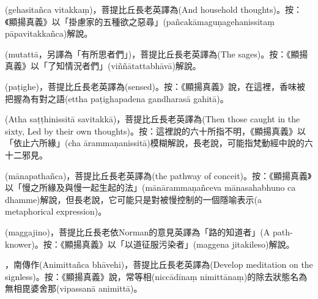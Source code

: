\startitemgroup[noteitems]
\item{}(gehasitañca vitakkaṃ)，菩提比丘長老英譯為(And household thoughts)。按：《顯揚真義》以「掛慮家的五種欲之惡尋」(pañcakāmaguṇagehanissitaṃ pāpavitakkañca)解說。
\stopitemgroup

\startitemgroup[noteitems]
\item{}(mutattā，另譯為「有所思者們」)，菩提比丘長老英譯為(The sages)。按：《顯揚真義》以「了知情況者們」(viññātattabhāvā)解說。
\stopitemgroup

\startitemgroup[noteitems]
\item{}(paṭighe)，菩提比丘長老英譯為(sensed)。按：《顯揚真義》說，在這裡，香味被把握為有對之語(ettha paṭighapadena gandharasā gahitā)。
\stopitemgroup

\startitemgroup[noteitems]
\item{}(Atha saṭṭhinissitā savitakkā)，菩提比丘長老英譯為(Then those caught in the sixty, Led by their own thoughts)。按：這裡說的六十所指不明，《顯揚真義》以「依止六所緣」(cha ārammaṇanissitā)模糊解說，長老說，可能指梵動經中說的六十二邪見。
\stopitemgroup

\startitemgroup[noteitems]
\item{}(mānapathañca)，菩提比丘長老英譯為(the pathway of conceit)。按：《顯揚真義》以「慢之所緣及與慢一起生起的法」(mānārammaṇañceva mānasahabhuno ca dhamme)解說，但長老說，它可能只是對被慢控制的一個隱喻表示(a metaphorical expression)。
\stopitemgroup

\startitemgroup[noteitems]
\item{}(maggajino)，菩提比丘長老依Norman的意見英譯為「路的知道者」(A path-knower)。按：《顯揚真義》以「以道征服污染者」(maggena jitakileso)解說。
\stopitemgroup

\startitemgroup[noteitems]
\item{}，南傳作(Animittañca bhāvehi)，菩提比丘長老英譯為(Develop meditation on the signless)。按：《顯揚真義》說，常等相(niccādīnaṃ nimittānaṃ)的除去狀態名為無相毘婆舍那(vipassanā animittā)。
\stopitemgroup

